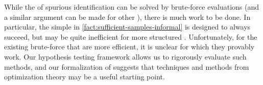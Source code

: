While the \downtaskname{} of spurious \covname{} identification can be solved by brute-force evaluations (and a similar argument can be made for other \countmodbehaviourname{} \downtasknames{}), there is much work to be done.
In particular, the simple \hyptestname{} in \cref{fact:sufficient-samples-informal} is designed to always succeed, but may be quite inefficient for more structured \modelnames{}.
Unfortunately, for the existing brute-force \hyptestnames{} that are more efficient, it is unclear for which \downtasknames{} they provably work.
%
%
Our hypothesis testing framework allows us to rigorously evaluate such methods, and our formalization of \downtasknames{} suggests that techniques and methods from optimization theory may be a useful starting point.
 
 

%
%
%
%
%
%
%
%
%
%
%
%
%
%
%


%




%
%
%
%

%
%
%
%


%


%


%
%



%

%



